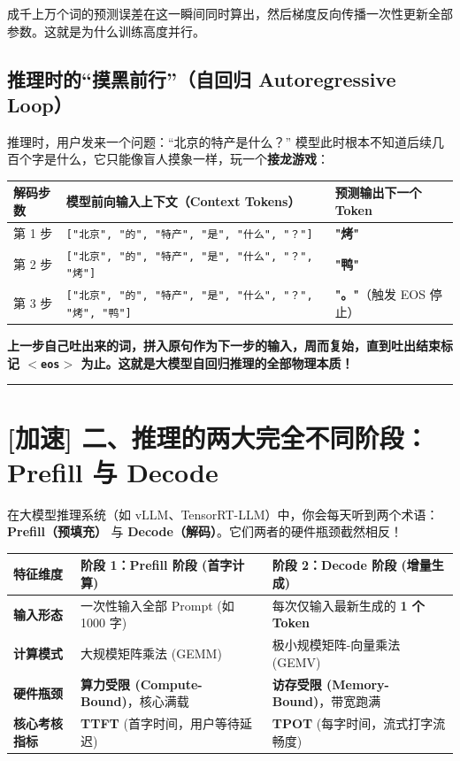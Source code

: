 成千上万个词的预测误差在这一瞬间同时算出，然后梯度反向传播一次性更新全部参数。这就是为什么训练高度并行。

\subsection{推理时的“摸黑前行”（自回归 Autoregressive Loop）}

推理时，用户发来一个问题：“北京的特产是什么？”
模型此时根本不知道后续几百个字是什么，它只能像盲人摸象一样，玩一个\textbf{接龙游戏}：

\begin{center}
\small
\begin{tabularx}{\textwidth}{p{1.8cm} X l}
\toprule
\textbf{解码步数} & \textbf{模型前向输入上下文（Context Tokens）} & \textbf{预测输出下一个 Token} \\
\midrule
第 1 步 & \texttt{["北京", "的", "特产", "是", "什么", "？"]} & \textbf{"烤"} \\
第 2 步 & \texttt{["北京", "的", "特产", "是", "什么", "？", "烤"]} & \textbf{"鸭"} \\
第 3 步 & \texttt{["北京", "的", "特产", "是", "什么", "？", "烤", "鸭"]} & \textbf{"。"}（触发 EOS 停止） \\
\bottomrule
\end{tabularx}
\end{center}

\textbf{上一步自己吐出来的词，拼入原句作为下一步的输入，周而复始，直到吐出结束标记 \texttt{$<$eos$>$} 为止。这就是大模型自回归推理的全部物理本质！}

\vspace{0.8em}\hrule\vspace{0.8em}

\section{[加速] 二、推理的两大完全不同阶段：Prefill 与 Decode}

在大模型推理系统（如 vLLM、TensorRT-LLM）中，你会每天听到两个术语：\textbf{Prefill（预填充）} 与 \textbf{Decode（解码）}。它们两者的硬件瓶颈截然相反！

\begin{center}
\small
\begin{tabularx}{\textwidth}{p{3.0cm} X X}
\toprule
\textbf{特征维度} & \textbf{阶段 1：Prefill 阶段 (首字计算)} & \textbf{阶段 2：Decode 阶段 (增量生成)} \\
\midrule
\textbf{输入形态} & 一次性输入全部 Prompt (如 1000 字) & 每次仅输入最新生成的 \textbf{1 个 Token} \\
\textbf{计算模式} & 大规模矩阵乘法 (GEMM) & 极小规模矩阵-向量乘法 (GEMV) \\
\textbf{硬件瓶颈} & \textbf{算力受限 (Compute-Bound)}，核心满载 & \textbf{访存受限 (Memory-Bound)}，带宽跑满 \\
\textbf{核心考核指标} & \textbf{TTFT} (首字时间，用户等待延迟) & \textbf{TPOT} (每字时间，流式打字流畅度) \\
\bottomrule
\end{tabularx}
\end{center}

